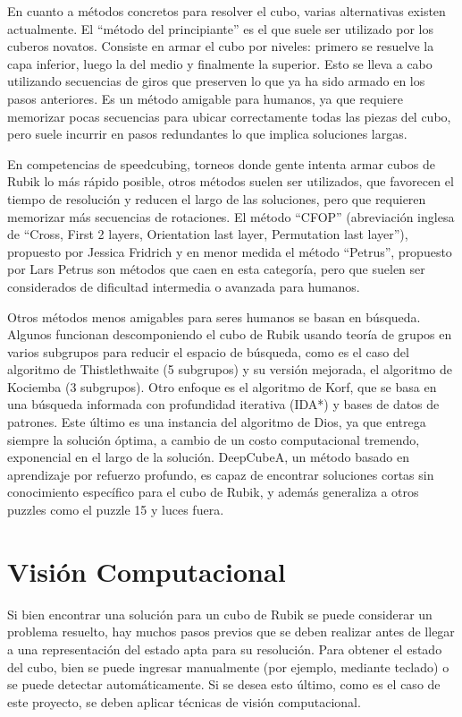 En cuanto a métodos concretos para resolver el cubo, varias alternativas existen actualmente. El ``método del principiante''\cite{beginner} es el que suele ser utilizado por los cuberos novatos. Consiste en armar el cubo por niveles: primero se resuelve la capa inferior, luego la del medio y finalmente la superior. Esto se lleva a cabo utilizando secuencias de giros que preserven lo que ya ha sido armado en los pasos anteriores. Es un método amigable para humanos, ya que requiere memorizar pocas secuencias para ubicar correctamente todas las piezas del cubo, pero suele incurrir en pasos redundantes lo que implica soluciones largas.

En competencias de speedcubing, torneos donde gente intenta armar cubos de Rubik lo más rápido posible, otros métodos suelen ser utilizados, que favorecen el tiempo de resolución y reducen el largo de las soluciones, pero que requieren memorizar más secuencias de rotaciones. El método ``CFOP'' (abreviación inglesa de ``Cross, First 2 layers, Orientation last layer, Permutation last layer''), propuesto por Jessica Fridrich\cite{fridrich} y en menor medida el método ``Petrus'', propuesto por Lars Petrus\cite{petrus} son métodos que caen en esta categoría, pero que suelen ser considerados de dificultad intermedia o avanzada para humanos.

Otros métodos menos amigables para seres humanos se basan en búsqueda. Algunos funcionan descomponiendo el cubo de Rubik usando teoría de grupos en varios subgrupos para reducir el espacio de búsqueda, como es el caso del algoritmo de Thistlethwaite\cite{thistlethwaite} (5 subgrupos) y su versión mejorada, el algoritmo de Kociemba\cite{kociemba} (3 subgrupos). Otro enfoque es el algoritmo de Korf\cite{korf}, que se basa en una búsqueda informada con profundidad iterativa (IDA*)\cite{ida} y bases de datos de patrones\cite{patterndatabases}. Este último es una instancia del algoritmo de Dios, ya que entrega siempre la solución óptima, a cambio de un costo computacional tremendo, exponencial en el largo de la solución\cite{korfcomplexity}. DeepCubeA\cite{deepcube}, un método basado en aprendizaje por refuerzo profundo, es capaz de encontrar soluciones cortas sin conocimiento específico para el cubo de Rubik, y además generaliza a otros puzzles como el puzzle 15 y luces fuera.


\section*{Visión Computacional}
Si bien encontrar una solución para un cubo de Rubik se puede considerar un problema resuelto, hay muchos pasos previos que se deben realizar antes de llegar a una representación del estado apta para su resolución. Para obtener el estado del cubo, bien se puede ingresar manualmente (por ejemplo, mediante teclado) o se puede detectar automáticamente. Si se desea esto último, como es el caso de este proyecto, se deben aplicar técnicas de visión computacional.

